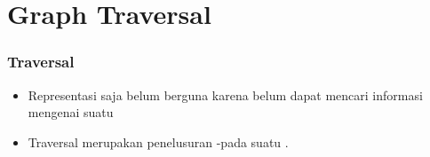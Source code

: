 \begin{comment}
\begin{frame}
\frametitle{Keuntungan dan Kerugian Representasi \fGraph}

\begin{itemize}
  \item Adjacency Matrix memakan lebih banyak memori. Hal ini dikarenakan adjacency matrix menyimpan keterangan dari satu node ke semua node. Sedangkan dalam adjacency list, suatu node hanya menyimpan keterangan mengenai node lain yang memiliki edge. Oleh karena itu, adjacency list lebih baik digunakan ketika edge yang terdapat tidak teralu banyak.
  \item Untuk melakukan pengecekan atau perubahan edge dari A ke B, pada adjacency matrix dapat dilakukan dengan hanya melihat dan mengubah matrix[A][B]. Sedangkan pada adjacency list, kita harus mengiterasi seluruh elemen pada list[A]
\end{itemize}
\end{frame}

\begin{frame}
\frametitle{Keuntungan dan Kerugian Representasi \fGraph (lanj.)}
\begin{itemize}
  \item Jika ada edge dari A ke B yang akan dibuang, maka pada adjacency matrix kita hanya perlu mengubah nilai Matrix[A][B]. Sedangkan pada adjacency list, harus dilakukan iterasi terlebih dahulu untuk mencari edge tersebut, lalu menghapusnya juga lebih rumit karena harus menggeser seluruh elemen setelahnya.
  \item Untuk mencari tetangga-tetangganya, maka pada adjacency matrix perlu dilakukan iterasi terhadap seluruh node yagn ada. Sementara itu, pada adjacency list hanya perlu dilakukan iterasi pada list yang isinya merupakan tetangga dari node yang bersangkutan.
\end{itemize}
\end{frame}
\end{comment}

\section{Graph Traversal}
\frame{\sectionpage}

\begin{frame}
\frametitle{\fGraph Traversal}
\begin{itemize}
  \item Representasi \fGraph saja belum berguna karena belum dapat mencari informasi mengenai suatu \fgraph
  \item \alert{\fGraph Traversal} merupakan penelusuran \fnode-\fnode pada suatu \fgraph.
\end{itemize}
\end{frame}

